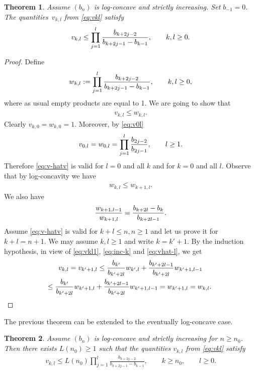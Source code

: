 \documentclass[pdftex]{sigma}
\numberwithin{equation}{section}
\newtheorem{thm}{Theorem}[section]
\begin{document}
\begin{thm}\label{thm:vkl-logcc} Assume $(b_n)$ is log-concave and strictly increasing. Set $b_{-1}=0$. The quanti\-ties~$v_{k,l}$ from \eqref{eq:vkl} satisfy
\begin{gather*}
v_{k,l}\le \prod_{j=1}^l {b_{k+2j-2}\over b_{k+2j-1}-b_{k-1}},\qquad k, l\ge 0.
\end{gather*}
 \end{thm}

 \begin{proof} Define
 \begin{gather*}
w_{k,l}:= \prod_{j=1}^l {b_{k+2j-2}\over b_{k+2j-1}-b_{k-1}},\qquad k,l\ge 0,
\end{gather*}
where as usual empty products are equal to 1. We are going to show that
 \begin{gather}\label{eq:v-hatv}
v_{k,l}\le w_{k,l}.
\end{gather}
 Clearly $v_{k,0}= w_{k,0}=1$. Moreover, by \eqref{eq:v0l}
\begin{gather*}
v_{0,l}=w_{0,l}=\prod_{j=1}^l {b_{2j-2}\over b_{2j-1}},\qquad l\ge 1.
\end{gather*}
Therefore \eqref{eq:v-hatv} is valid for $l=0$ and all $k$ and for $k=0$ and all $l$. Observe that by log-concavity we have
 \begin{gather}\label{eq:inc-k}
 w_{k,l}\le w_{k+1,l}.
\end{gather}
We also have
\begin{gather}\label{eq:vhat-l}
{w_{k+1,l-1}\over w_{k+1,l}}= { b_{k+2l}-b_{k}\over b_{k+2l-1}}.
\end{gather}
Assume \eqref{eq:v-hatv} is valid for $k+l\le n, n\ge 1$ and let us prove it for $k+l=n+1$. We may assume $k,l\ge 1$ and write $k=k'+1$. By the induction hypothesis, in view of \eqref{eq:vkl1}, \eqref{eq:inc-k} and \eqref{eq:vhat-l}, we get
 \begin{gather*}
 v_{k,l} = v_{k'+1,l}\le {b_{k'}\over b_{k'+2l}}w_{k',l}+{b_{k'+2l-1}\over b_{k'+2l}}w_{k'+1,l-1}\\
\hphantom{v_{k,l}}{} \le {b_{k'}\over b_{k'+2l}}w_{k'+1,l}+{b_{k'+2l-1}\over b_{k'+2l}}w_{k'+1,l-1}=w_{k'+1,l}=w_{k,l}.\tag*{\qed}
 \end{gather*}\renewcommand{\qed}{}
 \end{proof}

The previous theorem can be extended to the eventually log-concave case.

\begin{thm}\label{thm:vkl-evtlogcc} Assume $(b_n)$ is log-concave and strictly increasing for $n\ge n_0$. Then there exists $L(n_0)\ge 1$ such that the quantities $v_{k,l}$ from \eqref{eq:vkl} satisfy
\begin{gather*}
v_{k,l}\le L(n_0)\prod_{j=1}^l\frac{b_{k+2j-2}}{b_{k+2j-1}-b_{k-1}},\qquad k\ge n_0, \qquad l\ge 0.
\end{gather*}
\end{thm}
\end{document}
